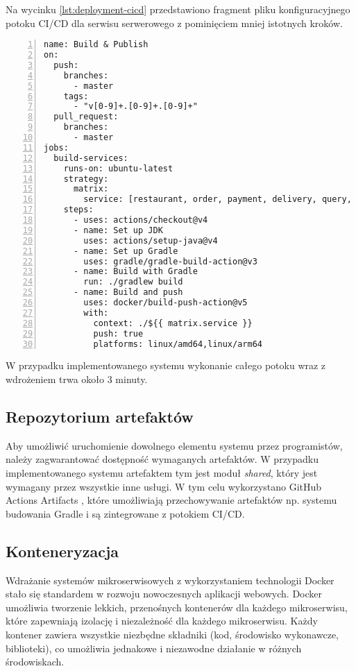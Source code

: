 Na wycinku \ref{lst:deployment-cicd} przedstawiono fragment pliku konfiguracyjnego potoku CI/CD dla serwisu serwerowego z pominięciem mniej istotnych kroków.

\begin{lstlisting}[caption={Fragment potoku CI/CD},label={lst:deployment-cicd},captionpos=b,numbers=left]
name: Build & Publish
on:
  push:
    branches:
      - master
    tags:
      - "v[0-9]+.[0-9]+.[0-9]+"
  pull_request:
    branches:
      - master
jobs:
  build-services:
    runs-on: ubuntu-latest
    strategy:
      matrix:
        service: [restaurant, order, payment, delivery, query, saga]
    steps:
      - uses: actions/checkout@v4
      - name: Set up JDK
        uses: actions/setup-java@v4
      - name: Set up Gradle
        uses: gradle/gradle-build-action@v3
      - name: Build with Gradle
        run: ./gradlew build
      - name: Build and push
        uses: docker/build-push-action@v5
        with:
          context: ./${{ matrix.service }}
          push: true
          platforms: linux/amd64,linux/arm64
\end{lstlisting}

W przypadku implementowanego systemu wykonanie całego potoku wraz z wdrożeniem trwa około 3 minuty.

\subsection{Repozytorium artefaktów}

Aby umożliwić uruchomienie dowolnego elementu systemu przez programistów, należy zagwarantować dostępność wymaganych artefaktów. W przypadku implementowanego systemu artefaktem tym jest moduł \textit{shared}, który jest wymagany przez wszystkie inne usługi. W tym celu wykorzystano GitHub Actions Artifacts \cite{gaa}, które umożliwiają przechowywanie artefaktów np. systemu budowania Gradle i są zintegrowane z potokiem CI/CD.

\subsection{Konteneryzacja}

Wdrażanie systemów mikroserwisowych z wykorzystaniem technologii Docker stało się standardem w rozwoju nowoczesnych aplikacji webowych. Docker umożliwia tworzenie lekkich, przenośnych kontenerów dla każdego mikroserwisu, które zapewniają izolację i niezależność dla każdego mikroserwisu. Każdy kontener zawiera wszystkie niezbędne składniki (kod, środowisko wykonawcze, biblioteki), co umożliwia  jednakowe i niezawodne działanie w różnych środowiskach. 

